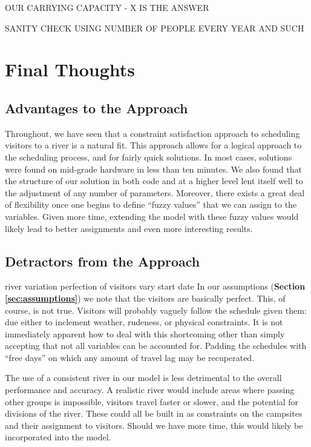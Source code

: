 \documentclass[11pt]{article} %
\begin{document}
OUR CARRYING CAPACITY - X IS THE ANSWER


SANITY CHECK USING NUMBER OF PEOPLE EVERY YEAR AND SUCH

\section{Final Thoughts}
\label{sec:conclusions}
\subsection{Advantages to the Approach}
\label{sec:pros}
Throughout, we have seen that a constraint satisfaction approach to scheduling
visitors to a river is a natural fit.  This approach allows for a logical
approach to the scheduling process, and for fairly quick solutions.  In most
cases, solutions were found on mid-grade hardware in less than ten minutes.
We also found that the structure of our solution in both code and at a
higher level lent itself well to the adjustment of any number of parameters.
Moreover, there exists a great deal of flexibility once one begins to define
``fuzzy values'' that we can assign to the variables.  Given more time,
extending the model with these fuzzy values would likely lead to better
assignments and even more interesting results.

\subsection{Detractors from the Approach}
\label{sec:cons}
river variation
perfection of visitors
vary start date
In our assumptions (\textbf{Section \ref{sec:assumptions}}) we note that the
visitors are basically perfect.  This, of course, is not true.  Visitors will
probably vaguely follow the schedule given them: due either to inclement
weather, rudeness, or physical constraints.  It is not immediately apparent
how to deal with this shortcoming other than simply accepting that not all
variables can be accounted for.  Padding the schedules with ``free days'' on
which any amount of travel lag may be recuperated.

The use of a consistent river in our model is less detrimental to the
overall performance and accuracy.  A realistic river would include areas
where passing other groups is impossible, visitors travel faster or slower,
and the potential for divisions of the river.  These could all be built in
as constraints on the campsites and their assignment to visitors.  Should
we have more time, this would likely be incorporated into the model.
\end{document}
